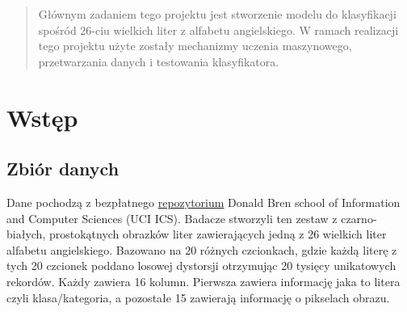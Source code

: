 \begin{abstract}
    Głównym zadaniem tego projektu jest stworzenie modelu do klasyfikacji spośród 26-ciu wielkich liter z alfabetu angielskiego.
    W ramach realizacji tego projektu użyte zostały mechanizmy uczenia maszynowego, przetwarzania danych i testowania klasyfikatora.
\end{abstract}

\section{Wstęp}\label{sec:wstep}
\subsection{Zbiór danych}\label{subsec:zbiordanych}
Dane pochodzą z bezpłatnego \href{https://archive.ics.uci.edu/dataset/59/letter+recognition}{repozytorium} Donald Bren school of Information and Computer Sciences (UCI ICS).
Badacze stworzyli ten zestaw z czarno-białych, prostokątnych obrazków liter zawierających jedną z 26 wielkich liter alfabetu angielskiego.
Bazowano na 20 różnych czcionkach, gdzie każdą literę z tych 20 czcionek poddano losowej dystorsji otrzymując 20 tysięcy unikatowych rekordów.
Każdy zawiera 16 kolumn. Pierwsza zawiera informację jaka to litera czyli klasa/kategoria, a pozostałe 15 zawierają informację o pikselach obrazu. 

